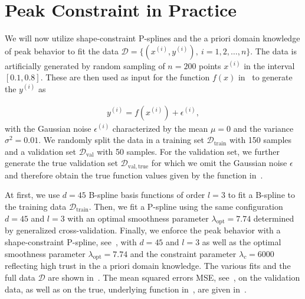 \section{Peak Constraint in Practice} \label{sec:peak-behav-noisy}

We will now utilize shape-constraint P-splines and the a priori domain knowledge of peak behavior to fit the data $\mathcal{D} = \{(x^{(i)}, y^{(i)}), \ i=1,2,\dots,n\}$. The data is artificially generated by random sampling of $n=200$ points $x^{(i)}$ in the interval $[0.1, 0.8]$. These are then used as input for the function $f(x)$ in~ to generate the $y^{(i)}$ as

\begin{align}
	y^{(i)} = f(x^{(i)}) + \epsilon^{(i)},
\end{align}
%
with the Gaussian noise $\epsilon^{(i)}$ characterized by the mean $\mu = 0$ and the variance $\sigma^2 = 0.01$. We randomly split the data in a training set $\mathcal{D}_{\mathrm{train}}$ with 150 samples and a validation set $\mathcal{D}_{\mathrm{val}}$ with 50 samples.  For the validation set, we further generate the true validation set $\mathcal{D}_{\mathrm{val}, \mathrm{true}}$ for which we omit the Gaussian noise $\epsilon$ and therefore obtain the true function values given by the function in~. 

At first, we use $d=45$ B-spline basis functions of order $l=3$ to fit a B-spline to the training data $\mathcal{D}_{\mathrm{train}}$. Then, we fit a P-spline using the same configuration $d=45$ and $l=3$ with an optimal smoothness parameter $\lambda_{\mathrm{opt}} = 7.74$ determined by generalized cross-validation. Finally, we enforce the peak behavior with a shape-constraint P-spline, see~, with $d=45$ and $l=3$ as well as the optimal smoothness parameter $\lambda_{\mathrm{opt}}=7.74$ and the constraint parameter $\lambda_c=6000$ reflecting high trust in the a priori domain knowledge. The various fits and the full data $\mathcal D$ are shown in~. The mean squared errors MSE, see~, on the validation data, as well as on the true, underlying function in~, are given in~.


